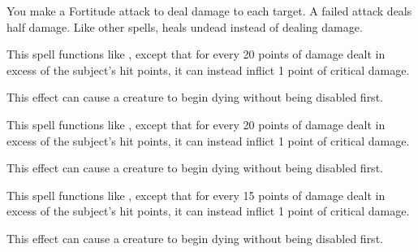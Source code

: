 \spellrng{\rngclose}
\begin{spelleffect}
    You make a Fortitude attack to deal damage to each target. A failed attack deals half damage. Like other  spells,  heals undead instead of dealing damage.
\end{spelleffect}

\begin{spelleffect}
  This spell functions like , except that for every 20 points of damage dealt in excess of the subject's hit points, it can instead inflict 1 point of critical damage.
\end{spelleffect}
\begin{spellnotes}
  This effect can cause a creature to begin dying without being disabled first.
\end{spellnotes}

\begin{spelleffect}
  This spell functions like , except that for every 20 points of damage dealt in excess of the subject's hit points, it can instead inflict 1 point of critical damage.
\end{spelleffect}
\begin{spellnotes}
  This effect can cause a creature to begin dying without being disabled first.
\end{spellnotes}

\begin{spelleffect}
  This spell functions like , except that for every 15 points of damage dealt in excess of the subject's hit points, it can instead inflict 1 point of critical damage.
\end{spelleffect}
\begin{spellnotes}
  This effect can cause a creature to begin dying without being disabled first.
\end{spellnotes}

